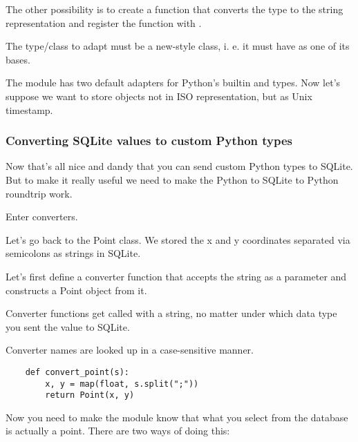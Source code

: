 The other possibility is to create a function that converts the type to the
string representation and register the function with .

    

\begin{notice}
The type/class to adapt must be a new-style class, i. e. it must have
 as one of its bases.
\end{notice}

The  module has two default adapters for Python's builtin
 and  types. Now let's suppose we
want to store  objects not in ISO representation, but
as Unix timestamp.

    

\subsubsection{Converting SQLite values to custom Python types}

Now that's all nice and dandy that you can send custom Python types to SQLite.
But to make it really useful we need to make the Python to SQLite to Python
roundtrip work.

Enter converters.

Let's go back to the Point class. We stored the x and y coordinates separated
via semicolons as strings in SQLite.

Let's first define a converter function that accepts the string as a parameter and constructs a Point object from it.

\begin{notice}
Converter functions  get called with a string, no matter
under which data type you sent the value to SQLite.
\end{notice}

\begin{notice}
Converter names are looked up in a case-sensitive manner.
\end{notice}


\begin{verbatim}
    def convert_point(s):
        x, y = map(float, s.split(";"))
        return Point(x, y)
\end{verbatim}

Now you need to make the  module know that what you select from the
database is actually a point. There are two ways of doing this:

